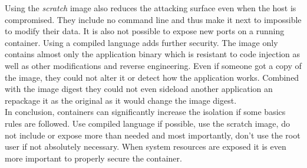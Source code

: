 Using the \textit{scratch} image also reduces the attacking surface even when the host is compromised. They include no command line and thus make it next to impossible to modify their data. It is also not possible to expose new ports on a running container. Using a compiled language adds further security. The image only contains almost only the application binary which is resistant to code injection as well as other modifications and reverse engineering. Even if someone got a copy of the image, they could not alter it or detect how the application works. Combined with the image digest they could not even sideload another application an repackage it as the original as it would change the image digest. \\
In conclusion, containers can significantly increase the isolation if some basics rules are followed. Use compiled language if possible, use the scratch image, do not include or expose more than needed and most importantly, don't use the root user if not absolutely necessary. When system resources are exposed it is even more important to properly secure the container. 